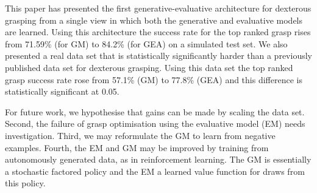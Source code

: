 This paper has presented the first generative-evaluative architecture for dexterous grasping from a single view in which both the generative and evaluative models are learned. Using this architecture the success rate for the top ranked grasp rises from 71.59\% (for GM) to 84.2\% (for GEA) on a simulated test set. We also presented a real data set that is statistically significantly harder than a previously published data set for dexterous grasping. Using this data set the top ranked grasp success rate rose from 57.1\% (GM) to 77.8\% (GEA) and this difference is statistically significant at 0.05.

For future work, we hypothesise that gains can be made by scaling the data set. Second, the failure of grasp optimisation using the evaluative model (EM) needs investigation. Third, we may reformulate the GM to learn from negative examples. Fourth, the EM and GM may be improved by training from autonomously generated data, as in reinforcement learning. The GM is essentially a stochastic factored policy and the EM a learned value function for draws from this policy. 